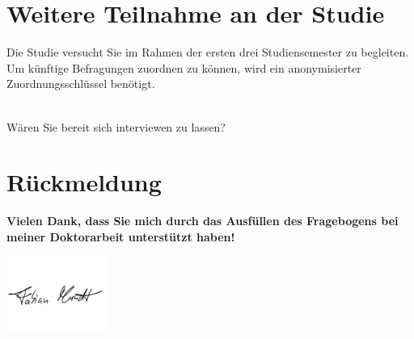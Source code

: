 
\vspace{-.25cm}
\section{Weitere Teilnahme an der Studie}
\vspace{.25cm}

\begin{choicequestion}[4]{Die Studie versucht Sie im Rahmen der ersten drei Studiensemester zu begleiten. Um künftige Befragungen zuordnen zu können, wird ein anonymisierter Zuordnungsschlüssel benötigt.}
	\\
	\\
\end{choicequestion}

\separate

\begin{choicequestion}[1]{Wären Sie bereit sich interviewen zu lassen?}
\end{choicequestion}

\vspace{.25cm}
\section{Rückmeldung}
\vspace{.25cm}



\separate

\textbf{Vielen Dank, dass Sie mich durch das Ausfüllen des Fragebogens bei meiner Doktorarbeit unterstützt haben!}

\vspace{-1.5cm}
\flushright\includegraphics[width=0.25\textwidth]{unterschrift.png}

